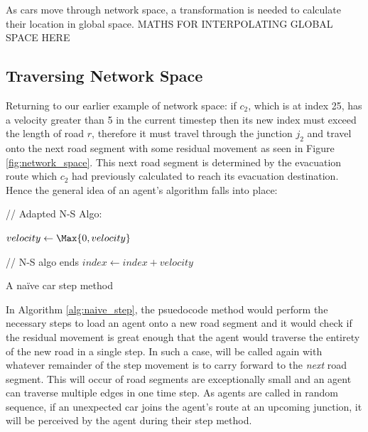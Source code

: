 As cars move through network space, a transformation is needed to calculate their location in global space. 
MATHS FOR INTERPOLATING GLOBAL SPACE HERE

\subsection{Traversing Network Space}
Returning to our earlier example of network space: if $c_2$, which is at index 25, has a velocity greater than 5 in the current timestep then its new index must exceed the length of road $r$, therefore it must travel through the junction $j_2$ and travel onto the next road segment with some residual movement as seen in Figure \ref{fig:network_space}. This next road segment is determined by the evacuation route which $c_2$ had previously calculated to reach its evacuation destination. Hence the general idea of an agent's  algorithm falls into place:

\vspace{0.5cm}
\begin{algorithm}[H]
    // Adapted N-S Algo:
    
    
    
    $velocity \leftarrow \Max{0,velocity}$\;
    
    // N-S algo ends
    \BlankLine
    $index \leftarrow index + velocity$\;
    
    \Location{}\;
    
    \caption{A naïve car step method}
    \label{alg:naive_step}
\end{algorithm}
\vspace{0.5cm}


In Algorithm \ref{alg:naive_step}, the  psuedocode method would perform the necessary steps to load an agent onto a new road segment and it would check if the residual movement is great enough that the agent would traverse the entirety of the new road in a single step. In such a case,  will be called again with whatever remainder of the step movement is to carry forward to the \textit{next} road segment. This will occur of road segments are exceptionally small and an agent can traverse multiple edges in one time step. As agents are called in random sequence, if an unexpected car joins the agent's route at an upcoming junction, it will be perceived by the agent during their step method. 


